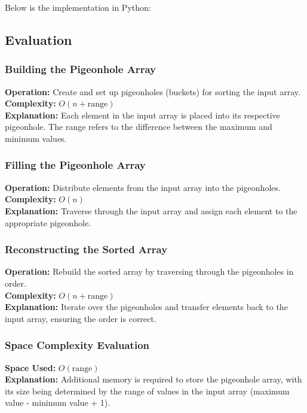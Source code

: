Below is the implementation in Python:


\subsection{Evaluation}

\subsubsection{Building the Pigeonhole Array}
\textbf{Operation:} Create and set up pigeonholes (buckets) for sorting the input array. \\
\textbf{Complexity:} \(O(n + \text{range})\) \\
\textbf{Explanation:} Each element in the input array is placed into its respective pigeonhole. The range refers to the difference between the maximum and minimum values.

\subsubsection{Filling the Pigeonhole Array}
\textbf{Operation:} Distribute elements from the input array into the pigeonholes. \\
\textbf{Complexity:} \(O(n)\) \\
\textbf{Explanation:} Traverse through the input array and assign each element to the appropriate pigeonhole.

\subsubsection{Reconstructing the Sorted Array}
\textbf{Operation:} Rebuild the sorted array by traversing through the pigeonholes in order. \\
\textbf{Complexity:} \(O(n + \text{range})\) \\
\textbf{Explanation:} Iterate over the pigeonholes and transfer elements back to the input array, ensuring the order is correct.

\subsubsection{Space Complexity Evaluation}
\textbf{Space Used:} \(O(\text{range})\) \\
\textbf{Explanation:} Additional memory is required to store the pigeonhole array, with its size being determined by the range of values in the input array (maximum value - minimum value + 1).

